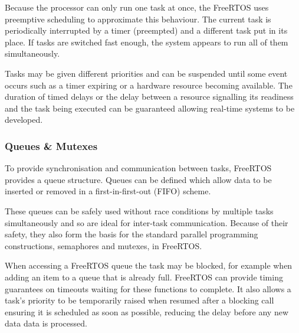 				Because the processor can only run one task at once, the FreeRTOS uses
				preemptive scheduling to approximate this behaviour. The current task is
				periodically interrupted by a timer (preempted) and a different task put
				in its place. If tasks are switched fast enough, the system appears to
				run all of them simultaneously.
				
				Tasks may be given different priorities and can be suspended until some
				event occurs such as a timer expiring or a hardware resource becoming
				available. The duration of timed delays or the delay between a resource
				signalling its readiness and the task being executed can be guaranteed
				allowing real-time systems to be developed.
				
			\subsubsection{Queues \& Mutexes}
				
				To provide synchronisation and communication between tasks, FreeRTOS
				provides a queue structure. Queues can be defined which allow data to be
				inserted or removed in a first-in-first-out (FIFO) scheme.
				
				These queues can be safely used without race conditions by multiple
				tasks simultaneously and so are ideal for inter-task communication.
				Because of their safety, they also form the basis for the standard
				parallel programming constructions, semaphores and mutexes, in FreeRTOS.
				
				When accessing a FreeRTOS queue the task may be blocked, for example
				when adding an item to a queue that is already full. FreeRTOS can
				provide timing guarantees on timeouts waiting for these functions to
				complete. It also allows a task's priority to be temporarily raised when
				resumed after a blocking call ensuring it is scheduled as soon as
				possible, reducing the delay before any new data data is processed.
